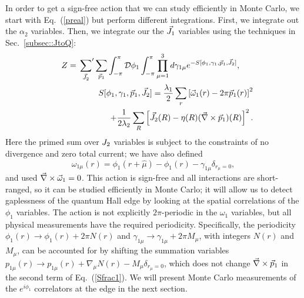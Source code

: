 In order to get a sign-free action that we can study efficiently in Monte Carlo, we start with Eq.~(\ref{preal}) but perform different integrations. 
First, we integrate out the $\alpha_{2}$ variables. Then, we integrate our the $\vec{J}_1$ variables using the techniques in Sec.~\ref{subsec::JtoQ}: 
\begin{eqnarray}
&&Z=\sideset{}{'}\sum_{\vec{J}_2}  \sum_{\vec{p}_1}  \int_{-\pi}^{\pi}  \mathcal{D}\phi_1 \int_{-\pi}^{\pi} \prod_{\mu=1}^{3} d\gamma_{1\mu}
e^{-S[\phi_1,\gamma_1,\vec{p}_1,\vec{J}_2]} , ~~~~~
\label{Zint} \\
&&~~ S[\phi_1,\gamma_1,\vec{p}_1,\vec{J}_2] =
\frac{\lambda_1}{2}\sum_{r} \left[\vec{\omega}_{1}(r)-2\pi \vec{p}_1(r) \right]^2 \nonumber\\
&&~~~~~~~~ + \frac{1}{2\lambda_2}\sum_R \left[\vec{J}_2(R)-\eta(R)(\vec{\nabla}\times\vec{p}_1)(R) \right]^2.
\label{Sfrac1}
\end{eqnarray}
Here the primed sum over $J_2$ variables is subject to the constraints of no divergence and zero total current; we have also defined
\begin{equation}
\omega_{1\mu}(r)=\phi_1(r+\hat{\mu})-\phi_1(r)-\gamma_{1\mu}\delta_{r_\mu=0},
\label{omega}
\end{equation}
and used $\vec{\nabla}\times\vec{\omega}_1 = 0$.
This action is sign-free and all interactions are short-ranged, so it can be studied efficiently in Monte Carlo; it will allow us to detect gaplessness of the quantum Hall edge by looking at the spatial correlations of the $\phi_1$ variables. The action is not explicitly $2\pi$-periodic in the $\omega_1$ variables, but all physical measurements have the required periodicity.  Specifically, the periodicity $\phi_1(r) \to \phi_1(r) + 2\pi N(r)$ and $\gamma_{1\mu} \to \gamma_{1\mu} + 2\pi M_\mu$, with integers $N(r)$ and $M_\mu$, can be accounted for by shifting the summation variables $p_{1\mu}(r) \to p_{1\mu}(r) + \nabla_\mu N(r) - M_\mu \delta_{r_\mu = 0}$, which does not change $\vec{\nabla}\times\vec{p}_1$ in the second term of Eq.~(\ref{Sfrac1}). 
We will present Monte Carlo measurements of the $e^{i\phi_1}$ correlators at the edge in the next section.

